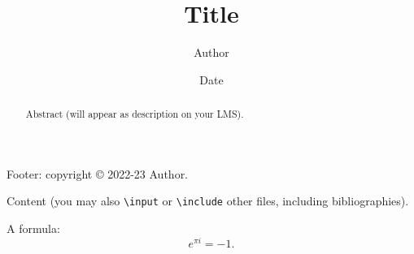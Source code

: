 \documentclass[oneside,11pt]{amsart}
\title{Title}
\author{Author}
\date{Date}
\begin{document}
\begin{abstract}
  Abstract (will appear as description on your LMS).
\end{abstract}

\maketitle

\begin{lxFooter}
  Footer: copyright \copyright{} 2022-23 Author.
\end{lxFooter}

Content (you may also \texttt{\textbackslash{}input} or
\texttt{\textbackslash{}include} other files, including bibliographies).

A formula:
\[ e^{\pi i} = -1. \]
\end{document}
